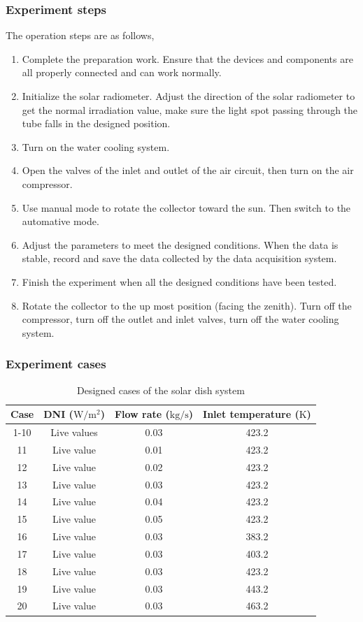\subsubsection{Experiment steps}
 The operation steps are as follows,
\begin{enumerate}[label=(\arabic*)]
	\item Complete the preparation work. Ensure that the devices and components are all properly connected and can work normally.
	\item Initialize the solar radiometer. Adjust the direction of the solar radiometer to get the normal irradiation value, make sure the light spot passing through the tube falls in the designed position.
	\item Turn on the water cooling system.
	\item Open the valves of the inlet and outlet of the air circuit, then turn on the air compressor.
	\item Use manual mode to rotate the collector toward the sun. Then switch to the automative mode.
	\item Adjust the parameters to meet the designed conditions. When the data is stable, record and save the data collected by the data acquisition system.
	\item Finish the experiment when all the designed conditions have been tested. 
	\item Rotate the collector to the up most position (facing the zenith). Turn off the compressor, turn off the outlet and inlet valves, turn off the water cooling system.
\end{enumerate}

\subsubsection{Experiment cases}

\begin{table}[htbp]\footnotesize
	\caption{Designed cases of the solar dish system}
	\centering
	\begin{tabular}{cccc}
		\toprule
		Case	& DNI ($\mathrm{W/m^2}$)	&	Flow rate ($\mathrm{kg/s}$)			&	Inlet temperature ($\mathrm{K}$)\\
		\midrule
		1-10	&	Live values	&	0.03	&	423.2\\
		11	&	Live value	&	0.01	&	423.2\\
		12	&	Live value	&	0.02	&	423.2\\
		13	&	Live value	&	0.03	&	423.2\\
		14	&	Live value	&	0.04	&	423.2\\
		15	&	Live value	&	0.05	&	423.2\\
		16	&	Live value	&	0.03	&	383.2\\
		17	&	Live value	&	0.03	&	403.2\\
		18	&	Live value	&	0.03	&	423.2\\
		19	&	Live value	&	0.03	&	443.2\\
		20	&	Live value	&	0.03	&	463.2\\
		\bottomrule
	\end{tabular}
	
	\label{tab:DesignedCasesForDish}
\end{table}

